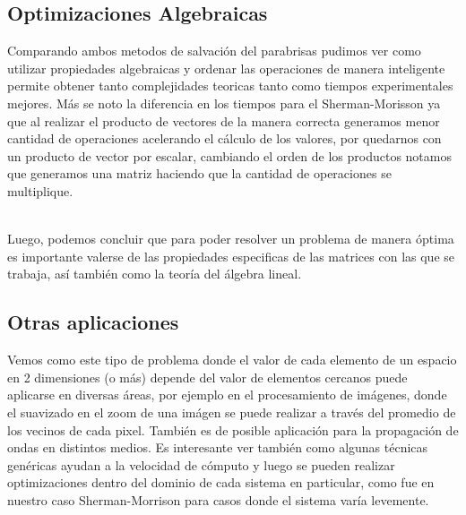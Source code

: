 \VER

\subsection{Optimizaciones Algebraicas}

Comparando ambos metodos de salvación del parabrisas pudimos ver como utilizar propiedades algebraicas y ordenar las operaciones de manera inteligente permite obtener tanto complejidades teoricas tanto como tiempos experimentales mejores. Más se noto la diferencia en los tiempos para el Sherman-Morisson ya que al realizar el producto de vectores de la manera correcta generamos menor cantidad de operaciones acelerando el cálculo de los valores, por quedarnos con un producto de vector por escalar, cambiando el orden de los productos notamos que generamos una matriz haciendo que la cantidad de operaciones se multiplique.

\\
Luego, podemos concluir que para poder resolver un problema de manera óptima es importante valerse de las propiedades especificas de las matrices con las que se trabaja, así también como la teoría del álgebra lineal.

\subsection{Otras aplicaciones}

Vemos como este tipo de problema donde el valor de cada elemento de un espacio en 2 dimensiones (o m\'as) depende del valor de elementos cercanos puede aplicarse en diversas \'areas, por ejemplo en el procesamiento de im\'agenes, donde el suavizado en el zoom de una im\'agen se puede realizar a trav\'es del promedio de los vecinos de cada pixel. Tambi\'en es de posible aplicaci\'on para la propagaci\'on de ondas en distintos medios. Es interesante ver tambi\'en como algunas t\'ecnicas gen\'ericas ayudan a la velocidad de c\'omputo y luego se pueden realizar optimizaciones dentro del dominio de cada sistema en particular, como fue en nuestro caso Sherman-Morrison para casos donde el sistema var\'ia levemente.
